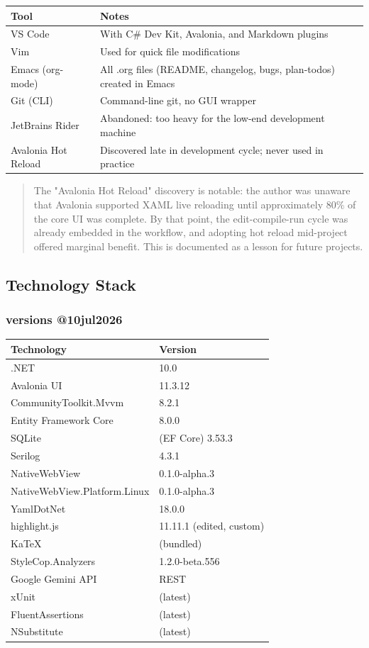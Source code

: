 \documentclass[14pt]{article}
\begin{document}
\begin{center}
\begin{tabular}{ll}
Tool & Notes\\
\hline
VS Code & With C\# Dev Kit, Avalonia, and Markdown plugins\\
Vim & Used for quick file modifications\\
Emacs (org-mode) & All .org files (README, changelog, bugs, plan-todos) created in Emacs\\
Git (CLI) & Command-line git, no GUI wrapper\\
JetBrains Rider & Abandoned: too heavy for the low-end development machine\\
Avalonia Hot Reload & Discovered late in development cycle; never used in practice\\
\end{tabular}
\end{center}

\begin{quote}
The "Avalonia Hot Reload" discovery is notable: the author was unaware
that Avalonia supported XAML live reloading until approximately 80\% of
the core UI was complete. By that point, the edit-compile-run cycle was
already embedded in the workflow, and adopting hot reload mid-project
offered marginal benefit. This is documented as a lesson for future
projects.
\end{quote}

\newpage
\subsection{Technology Stack}
\label{sec:org7455d92}
\subsubsection{versions @10jul2026}
\label{sec:orgfda4fec}
\begin{center}
\begin{tabular}{ll}
Technology & Version\\
\hline
.NET & 10.0\\
Avalonia UI & 11.3.12\\
CommunityToolkit.Mvvm & 8.2.1\\
Entity Framework Core & 8.0.0\\
SQLite & (EF Core) 3.53.3\\
Serilog & 4.3.1\\
NativeWebView & 0.1.0-alpha.3\\
NativeWebView.Platform.Linux & 0.1.0-alpha.3\\
YamlDotNet & 18.0.0\\
highlight.js & 11.11.1 (edited, custom)\\
KaTeX & (bundled)\\
StyleCop.Analyzers & 1.2.0-beta.556\\
Google Gemini API & REST\\
xUnit & (latest)\\
FluentAssertions & (latest)\\
NSubstitute & (latest)\\
\end{tabular}
\end{center}
\end{document}
